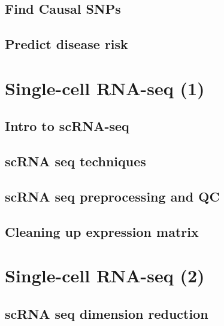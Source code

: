 \documentclass[
]{book}
\begin{document}
\hypertarget{find-causal-snps}{%
\section{Find Causal SNPs}\label{find-causal-snps}}

\hypertarget{predict-disease-risk}{%
\section{Predict disease risk}\label{predict-disease-risk}}

\hypertarget{scrna1}{%
\chapter{Single-cell RNA-seq (1)}\label{scrna1}}

\hypertarget{intro-to-scrna-seq}{%
\section{Intro to scRNA-seq}\label{intro-to-scrna-seq}}

\hypertarget{scrna-seq-techniques}{%
\section{scRNA seq techniques}\label{scrna-seq-techniques}}

\hypertarget{scrna-seq-preprocessing-and-qc}{%
\section{scRNA seq preprocessing and QC}\label{scrna-seq-preprocessing-and-qc}}

\hypertarget{cleaning-up-expression-matrix}{%
\section{Cleaning up expression matrix}\label{cleaning-up-expression-matrix}}

\hypertarget{scrna2}{%
\chapter{Single-cell RNA-seq (2)}\label{scrna2}}

\hypertarget{scrna-seq-dimension-reduction}{%
\section{scRNA seq dimension reduction}\label{scrna-seq-dimension-reduction}}
\end{document}
